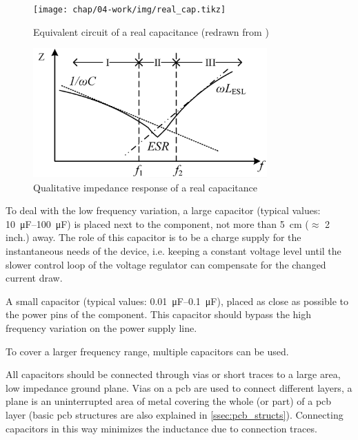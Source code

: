 \tikzexternaldisable
\begin{figure}[tbh]
	\centering
	\texttt{[image: chap/04-work/img/real\_cap.tikz]}
	\caption[Capacitor equivalent circuit]{Equivalent circuit of a real capacitance (redrawn from \cite{decouple})}
	\label{fig:real_cap}
\end{figure}
\tikzexternalenable
\begin{figure}[tbh]
	\centering
	\includegraphics[width = 0.8\textwidth]{chap/04-work/img/esl_esr}
	\caption[Impedance response of a real capacitor]{Qualitative impedance response of a real capacitance \cite{Dang2020}}
	\label{fig:esl_esr}
\end{figure}


To deal with the low frequency variation, a large capacitor (typical values: \SIrange{10}{100}{\micro\farad}) is placed next to the component, not more than \SI{5}{\centi \metre} ($\approx$ 2 inch.) away.
The role of this capacitor is to be a charge supply for the instantaneous needs of the device, i.e. keeping a constant voltage level until the slower control loop of the voltage regulator can compensate for the changed current draw. \cite{decouple}

A small capacitor (typical values: \SIrange{0.01}{0.1}{\micro \farad}), placed as close as possible to the power pins of the component.
This capacitor should bypass the high frequency variation on the power supply line. \cite{decouple}

To cover a larger frequency range, multiple capacitors can be used.

All capacitors should be connected through vias or short traces to a large area, low impedance ground plane. Vias on a \gls{pcb} are used to connect different layers, a plane is an uninterrupted area of metal covering the whole (or part) of a \gls{pcb} layer (basic \gls{pcb} structures are also  explained in \autoref{ssec:pcb_structs}). 
Connecting capacitors in this way minimizes the inductance due to connection traces. \cite{decouple}

